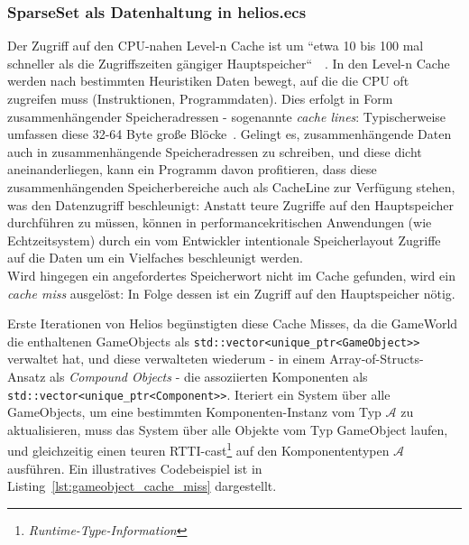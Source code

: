 \subsubsection{SparseSet als Datenhaltung in helios.ecs}

Der Zugriff auf den CPU-nahen Level-n Cache ist um ``etwa 10 bis 100 mal schneller als die Zugriffszeiten gängiger Hauptspeicher``~\cite[S. 5]{Man20}~\cite[79]{HP17}.
In den Level-n Cache werden nach bestimmten Heuristiken Daten bewegt, auf die die CPU oft zugreifen muss (Instruktionen, Programmdaten).
Dies erfolgt in Form zusammenhängender Speicheradressen - sogenannte \textit{cache lines}: Typischerweise umfassen diese 32-64 Byte große Blöcke~\cite[531]{TB23}.
Gelingt es, zusammenhängende Daten auch in zusammenhängende Speicheradressen zu schreiben, und diese dicht aneinanderliegen, kann ein Programm davon profitieren, dass diese zusammenhängenden Speicherbereiche auch als CacheLine zur Verfügung stehen, was den Datenzugriff beschleunigt: Anstatt teure Zugriffe auf den Hauptspeicher durchführen zu müssen, können in performancekritischen Anwendungen (wie Echtzeitsystem) durch ein vom Entwickler intentionale Speicherlayout Zugriffe auf die Daten um ein Vielfaches beschleunigt werden.\\

\noinndet
Wird hingegen ein angefordertes Speicherwort nicht im Cache gefunden, wird ein \textit{cache miss} ausgelöst: In Folge dessen ist ein Zugriff auf den Hauptspeicher nötig.

Erste Iterationen von Helios begünstigten diese Cache Misses, da die GameWorld die enthaltenen GameObjects als \texttt{std::vector<unique\_ptr<GameObject>>} verwaltet hat, und diese verwalteten wiederum - in einem Array-of-Structs-Ansatz als \textit{Compound Objects} - die assoziierten Komponenten als \texttt{std::vector<unique\_ptr<Component>>}.
Iteriert ein System über alle GameObjects, um eine bestimmten Komponenten-Instanz vom Typ $\mathcal{A}$ zu aktualisieren, muss das System über alle Objekte vom Typ GameObject laufen, und gleichzeitig einen teuren RTTI-cast\footnote{\textit{Runtime-Type-Information}} auf den Komponententypen $\mathcal{A}$ ausführen.
Ein illustratives Codebeispiel ist in Listing~\ref{lst:gameobject_cache_miss} dargestellt.



